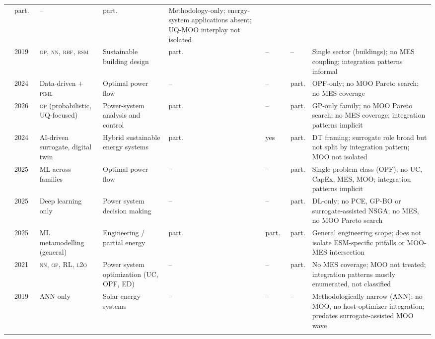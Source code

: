\begin{table}[!t]
\begin{tabularx}{\textwidth}{@{}L{0.10\textwidth} L{0.04\textwidth} L{0.16\textwidth} L{0.18\textwidth} C{0.04\textwidth} C{0.04\textwidth} C{0.04\textwidth} L{0.30\textwidth}@{}}
      & part.\ & -- & part.
      & Methodology-only; energy-system applications absent; UQ-MOO interplay not isolated \\
    \cite{Westermann2019}
      & 2019
      & \textsc{gp}, \textsc{nn}, \textsc{rbf}, \textsc{rsm}
      & Sustainable building design
      & part.\ & -- & --
      & Single sector (buildings); no MES coupling; integration patterns informal \\
    \cite{Mohammadi2024}
      & 2024
      & Data-driven + \textsc{piml}
      & Optimal power flow
      & -- & -- & part.
      & OPF-only; no MOO Pareto search; no MES coverage \\
    \cite{Tan2026}
      & 2026
      & \textsc{gp} (probabilistic, UQ-focused)
      & Power-system analysis and control
      & part.\ & -- & part.
      & GP-only family; no MOO Pareto search; no MES coverage; integration patterns implicit \\
    \cite{Khan2024_DT}
      & 2024
      & AI-driven surrogate, digital twin
      & Hybrid sustainable energy systems
      & part.\ & yes & part.
      & DT framing; surrogate role broad but not split by integration pattern; MOO not isolated \\
    \cite{Khaloie2025}
      & 2025
      & ML across families
      & Optimal power flow
      & -- & -- & part.
      & Single problem class (OPF); no UC, CapEx, MES, MOO; integration patterns implicit \\
    \cite{Lim2025}
      & 2025
      & Deep learning only
      & Power system decision making
      & -- & -- & part.
      & DL-only; no PCE, GP-BO or surrogate-assisted NSGA; no MES, no MOO Pareto search \\
    \cite{Starke2025214}
      & 2025
      & ML metamodelling (general)
      & Engineering / partial energy
      & part.\ & part.\ & part.
      & General engineering scope; does not isolate ESM-specific pitfalls or MOO-MES intersection \\
    \cite{Ruan2021221}
      & 2021
      & \textsc{nn}, \textsc{gp}, RL, \textsc{l2o}
      & Power system optimization (UC, OPF, ED)
      & -- & -- & part.
      & No MES coverage; MOO not treated; integration patterns mostly enumerated, not classified \\
    \cite{Elsheikh2019622}
      & 2019
      & ANN only
      & Solar energy systems
      & -- & -- & --
      & Methodologically narrow (ANN); no MOO, no host-optimizer integration; predates surrogate-assisted MOO wave \\
    \cite{Elwy2024}

\end{tabularx}
\end{table}
